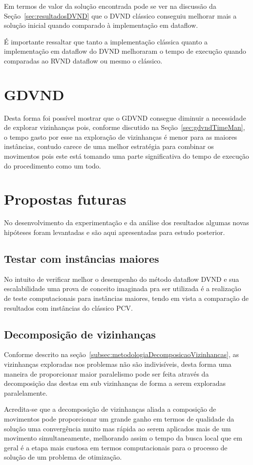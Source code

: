 Em termos de valor da solução encontrada pode se ver na discussão da Seção~\ref{sec:resultadosDVND} que o DVND clássico conseguiu melhorar mais a solução inicial quando comparado à implementação em dataflow.

É importante ressaltar que tanto a implementação clássica quanto a implementação em dataflow do DVND melhoraram o tempo de execução quando comparadas ao RVND dataflow ou mesmo o clássico.

\section{GDVND}

Desta forma foi possível mostrar que o GDVND consegue diminuir a necessidade de explorar vizinhanças pois, conforme discutido na Seção~\ref{sec:gdvndTimeMan}, o tempo gasto por esse na exploração de vizinhanças é menor para as maiores instâncias, contudo carece de uma melhor estratégia para combinar os movimentos pois este está tomando uma parte significativa do tempo de execução do procedimento como um todo.

% 

\section{Propostas futuras}

No desenvolvimento da experimentação e da análise dos resultados algumas novas hipóteses foram levantadas e são aqui apresentadas para estudo posterior.

\subsection{Testar com instâncias maiores} \label{subsec:instanciasMaiores}

No intuito de verificar melhor o desempenho do método dataflow DVND e sua escalabilidade uma prova de conceito imaginada pra ser utilizada é a realização de teste computacionais para instâncias maiores, tendo em vista a comparação de resultados com instâncias do clássico PCV.

\subsection{Decomposição de vizinhanças} \label{subsec:decomposicaoVizinhancas}

Conforme descrito na seção~\ref{subsec:metodologiaDecomposicaoVizinhancas}, as vizinhanças exploradas nos problemas não são indivisíveis, desta forma uma maneira de proporcionar maior paralelismo pode ser feita através da decomposição das destas em sub vizinhanças de forma a serem exploradas paralelamente.

Acredita-se que a decomposição de vizinhanças aliada a composição de movimentos pode proporcionar um grande ganho em termos de qualidade da solução uma convergência muito mas rápida ao serem aplicados mais de um movimento simultaneamente, melhorando assim o tempo da busca local que em geral é a etapa mais custosa em termos computacionais para o processo de solução de um problema de otimização.

% 